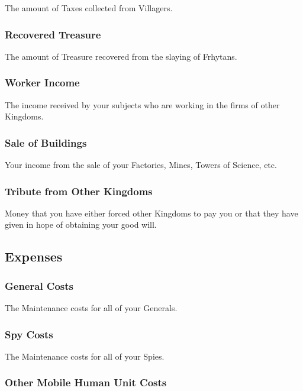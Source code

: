 The amount of Taxes collected from Villagers.

\subsubsection{\textsf{Recovered Treasure}}

The amount of Treasure recovered from the slaying of Frhytans.

\subsubsection{\textsf{Worker Income}}

The income received by your subjects who are working in the firms of other Kingdoms.

\subsubsection{\textsf{Sale of Buildings}}

Your income from the sale of your Factories, Mines, Towers of Science, etc.

\subsubsection{\textsf{Tribute from Other Kingdoms}}

Money that you have either forced other Kingdoms to pay you or that they have given in hope of obtaining your good will.

\subsection{\textsf{Expenses}}


\subsubsection{\textsf{General Costs}}

The Maintenance costs for all of your Generals.

\subsubsection{\textsf{Spy Costs}}

The Maintenance costs for all of your Spies.

\subsubsection{\textsf{Other Mobile Human Unit Costs}}

